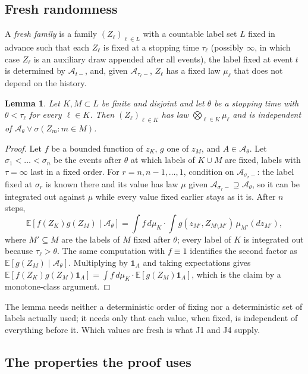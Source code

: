 \documentclass[10pt,a4paper]{article}
\newcommand{\E}{\mathbb{E}}
\newcommand{\cA}{\mathcal{A}}
\newcommand{\one}{\mathbf{1}}
\theoremstyle{plain}
\newtheorem{slemma}{Lemma}
\theoremstyle{remark}
\begin{document}
\subsection{Fresh randomness}

A \emph{fresh family} is a family $(Z_\ell)_{\ell\in L}$ with a countable label set $L$ fixed in advance such that each $Z_\ell$ is fixed at a stopping time $\tau_\ell$ (possibly $\infty$, in which case $Z_\ell$ is an auxiliary draw appended after all events), the label fixed at event $t$ is determined by $\cA_{t-}$, and, given $\cA_{\tau_\ell-}$, $Z_\ell$ has a fixed law $\mu_\ell$ that does not depend on the history.

\begin{slemma}\label{lem:fresh}
Let $K,M\subset L$ be finite and disjoint and let $\theta$ be a stopping time with $\theta<\tau_\ell$ for every $\ell\in K$. Then $(Z_\ell)_{\ell\in K}$ has law $\bigotimes_{\ell\in K}\mu_\ell$ and is independent of $\cA_\theta\vee\sigma(Z_m:m\in M)$.
\end{slemma}

\begin{proof}
Let $f$ be a bounded function of $z_K$, $g$ one of $z_M$, and $A\in\cA_\theta$. Let $\sigma_1<\dots<\sigma_n$ be the events after $\theta$ at which labels of $K\cup M$ are fixed, labels with $\tau=\infty$ last in a fixed order. For $r=n,n-1,\dots,1$, condition on $\cA_{\sigma_r-}$: the label fixed at $\sigma_r$ is known there and its value has law $\mu$ given $\cA_{\sigma_r-}\supseteq\cA_\theta$, so it can be integrated out against $\mu$ while every value fixed earlier stays as it is. After $n$ steps,
\[
\E[f(Z_K)g(Z_M)\mid\cA_\theta]=\int f\,d\mu_K\cdot\int g(z_{M'},Z_{M\setminus M'})\,\mu_{M'}(dz_{M'}),
\]
where $M'\subseteq M$ are the labels of $M$ fixed after $\theta$; every label of $K$ is integrated out because $\tau_\ell>\theta$. The same computation with $f\equiv1$ identifies the second factor as $\E[g(Z_M)\mid\cA_\theta]$. Multiplying by $\one_A$ and taking expectations gives $\E[f(Z_K)g(Z_M)\one_A]=\int f\,d\mu_K\cdot\E[g(Z_M)\one_A]$, which is the claim by a monotone-class argument.
\end{proof}

The lemma needs neither a deterministic order of fixing nor a deterministic set of labels actually used; it needs only that each value, when fixed, is independent of everything before it. Which values are fresh is what J1 and J4 supply.

\subsection{The properties the proof uses}
\end{document}
